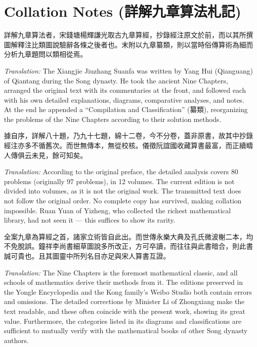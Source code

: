 \documentclass[11pt,a4paper]{article}
\newcommand{\zh}[1]{{#1}}
\newenvironment{chpassage}{%
  \par\medskip
  \begin{center}
  \begin{minipage}{0.95\textwidth}
  \setlength{\parindent}{2em}
  \linespread{1.3}\selectfont
}{%
  \end{minipage}
  \end{center}
  \medskip
}
\begin{document}
\newpage

\section{Collation Notes (\zh{詳解九章算法札記})}

\begin{chpassage}
\zh{詳解九章算法者，宋錢塘楊輝謙光取古九章算經，抄錄經注原文於前，而以其所撰圖解釋注比類圖說驗辭各條之後者也。末附以九章纂類，則以當時俗傳算術為細而分析九章題問以類相從焉。}

\medskip
\textit{Translation:} The Xiangjie Jiuzhang Suanfa was written by Yang Hui
(Qianguang) of Qiantang during the Song dynasty. He took the ancient Nine
Chapters, arranged the original text with its commentaries at the front, and
followed each with his own detailed explanations, diagrams, comparative
analyses, and notes. At the end he appended a ``Compilation and
Classification'' (\zh{纂類}), reorganizing the problems of the Nine Chapters
according to their solution methods.
\end{chpassage}

\begin{chpassage}
\zh{據自序，詳解八十題，乃九十七題，綿十二卷，今不分卷，蓋非原書，故其中抄錄經注亦多不循舊次。而世無傳本，無從校核。儀徵阮誼國收藏算書最富，而正續疇人傳俱云未見，餘可知矣。}

\medskip
\textit{Translation:} According to the original preface, the detailed
analysis covers 80 problems (originally 97 problems), in 12 volumes. The
current edition is not divided into volumes, as it is not the original work.
The transmitted text does not follow the original order. No complete copy has
survived, making collation impossible. Ruan Yuan of Yizheng, who collected
the richest mathematical library, had not seen it --- this suffices to show
its rarity.
\end{chpassage}

\begin{chpassage}
\zh{全案九章為算經之首，諸家立術皆自此出。而世傳永樂大典及孔氏微波榭二本，均不免脫誤。鐘祥李尚書細草圖說多所改正，方可卒讀，而往往與此書暗合，則此書誠可貴也。且其圖靈中所列名目亦足與宋人算書互證。}

\medskip
\textit{Translation:} The Nine Chapters is the foremost mathematical classic,
and all schools of mathematics derive their methods from it. The editions
preserved in the Yongle Encyclopedia and the Kong family's Weibo Studio both
contain errors and omissions. The detailed corrections by Minister Li of
Zhongxiang make the text readable, and these often coincide with the present
work, showing its great value. Furthermore, the categories listed in its
diagrams and classifications are sufficient to mutually verify with the
mathematical books of other Song dynasty authors.
\end{chpassage}
\end{document}
